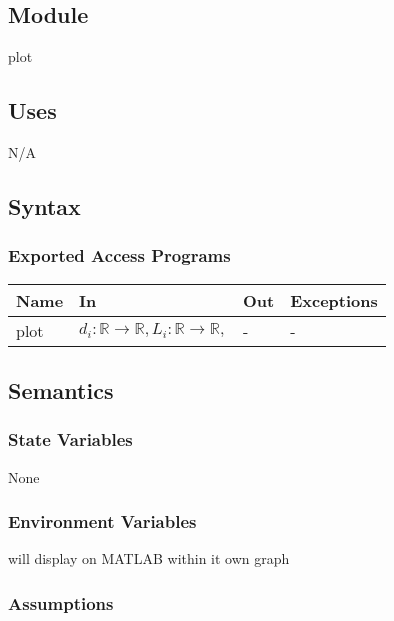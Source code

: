 \documentclass[12pt, titlepage]{article}
\begin{document}
\subsection{Module}

plot

\subsection{Uses}

N/A

\subsection{Syntax}

\subsubsection{Exported Access Programs}

\begin{center}
\begin{tabular}{p{2cm} p{8cm} p{2cm} p{2cm}}
\hline
\textbf{Name} & \textbf{In} & \textbf{Out} & \textbf{Exceptions} \\
\hline
plot & $d_i:\mathbb{R} \rightarrow \mathbb{R},
                 L_i:\mathbb{R} \rightarrow \mathbb{R},
                 $ & - & - \\
\hline
\end{tabular}
\end{center}

\subsection{Semantics}

\subsubsection{State Variables}

None

\subsubsection{Environment Variables}

will display on MATLAB within it own graph\\

\subsubsection{Assumptions}
\end{document}
